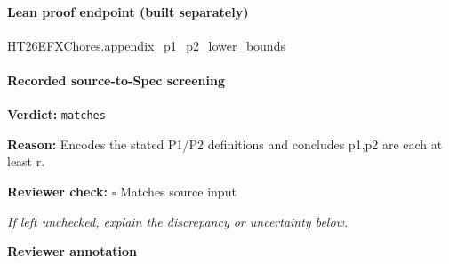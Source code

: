 \documentclass[10pt]{article}
\newcommand{\reviewerbox}{%
  \par\noindent\fbox{\parbox{0.96\linewidth}{\rule{0pt}{0.38in}}}\par
}
\newcommand{\reviewmatch}[1]{%
  \par\noindent\textbf{Reviewer check:} $\square$\; #1\par
  \noindent\emph{If left unchecked, explain the discrepancy or uncertainty below.}\par
}
\begin{document}
\paragraph{Lean proof endpoint (built separately)}\begin{ReviewVerbatim}
HT26EFXChores.appendix_p1_p2_lower_bounds
\end{ReviewVerbatim}

\paragraph{Recorded source-to-Spec screening}
\textbf{Verdict:} \texttt{matches}
\\
{\raggedright
\textbf{Reason:} Encodes the stated P1/\allowbreak{}P2 definitions and concludes p1,p2 are each at least r.\allowbreak{}
\par}
\reviewmatch{Matches source input}
\noindent\textbf{Reviewer annotation}\par
\reviewerbox
\end{document}
